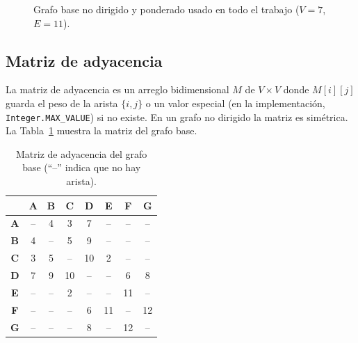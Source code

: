 \documentclass[conference]{IEEEtran}
\begin{document}
\begin{figure}[t]
\centering
{}
\caption{Grafo base no dirigido y ponderado usado en todo el trabajo ($V=7$, $E=11$).}
\label{fig:base}
\end{figure}

\subsection{Matriz de adyacencia}
La matriz de adyacencia es un arreglo bidimensional $M$ de $V\times V$ donde $M[i][j]$ guarda el peso de la arista $\{i,j\}$ o un valor especial (en la implementación, \texttt{Integer.MAX\_VALUE}) si no existe. En un grafo no dirigido la matriz es simétrica. La Tabla~\ref{tab:matriz} muestra la matriz del grafo base.

\begin{table}[t]
\caption{Matriz de adyacencia del grafo base (``--'' indica que no hay arista).}
\label{tab:matriz}
\centering
\footnotesize
\setlength{\tabcolsep}{5pt}
\begin{tabular}{c|ccccccc}
 & \textbf{A} & \textbf{B} & \textbf{C} & \textbf{D} & \textbf{E} & \textbf{F} & \textbf{G} \\
\hline
\textbf{A} & -- & 4 & 3 & 7 & -- & -- & -- \\
\textbf{B} & 4 & -- & 5 & 9 & -- & -- & -- \\
\textbf{C} & 3 & 5 & -- & 10 & 2 & -- & -- \\
\textbf{D} & 7 & 9 & 10 & -- & -- & 6 & 8 \\
\textbf{E} & -- & -- & 2 & -- & -- & 11 & -- \\
\textbf{F} & -- & -- & -- & 6 & 11 & -- & 12 \\
\textbf{G} & -- & -- & -- & 8 & -- & 12 & -- \\
\end{tabular}
\end{table}
\end{document}
